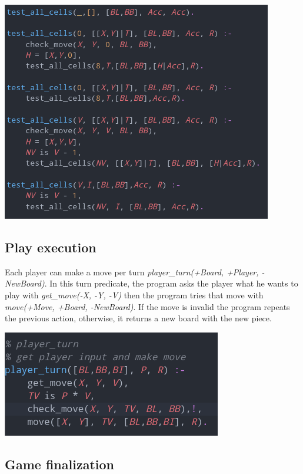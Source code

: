 \documentclass[a4paper]{article}
\begin{document}
\begin{center}
    \includegraphics[scale=0.4]{img/test_all.png}
\end{center}



\subsection{Play execution} 
Each player can make a move per turn \textit{player\_turn(+Board, +Player, -NewBoard)}. In this turn predicate, the program asks the player what he wants to play with \textit{get\_move(-X, -Y, -V)} then the program tries that move with \textit{move(+Move, +Board, -NewBoard)}.
If the move is invalid the program repeats the previous action, otherwise, it returns a new board with the new piece.

\begin{center}
    \includegraphics[scale=0.4]{img/player_turn.png}
\end{center}

\pagebreak
\subsection{Game finalization} 
\end{document}
